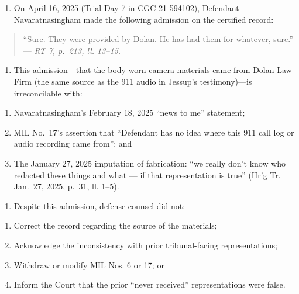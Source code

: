 \begin{enumerate}
\def\labelenumi{\arabic{enumi}.}
\setcounter{enumi}{47}
\tightlist
\item
  On April 16, 2025 (Trial Day 7 in CGC-21-594102), Defendant Navaratnasingham made the following admission on the certified record:
\end{enumerate}

\begin{quote}
``Sure. They were provided by Dolan. He has had them for whatever, sure.'' --- \emph{RT 7, p.~213, ll. 13--15.}
\end{quote}

\begin{enumerate}
\def\labelenumi{\arabic{enumi}.}
\setcounter{enumi}{48}
\tightlist
\item
  This admission---that the body-worn camera materials came from Dolan Law Firm (the same source as the 911 audio in Jessup's testimony)---is irreconcilable with:
\end{enumerate}

\begin{enumerate}
\def\labelenumi{(\alph{enumi})}
\item
  Navaratnasingham's February 18, 2025 ``news to me'' statement;
\item
  MIL No.~17's assertion that ``Defendant has no idea where this 911 call log or audio recording came from''; and
\item
  The January 27, 2025 imputation of fabrication: ``we really don't know who redacted these things and what --- if that representation is true'' (Hr'g Tr. Jan.~27, 2025, p.~31, ll. 1--5).
\end{enumerate}

\begin{enumerate}
\def\labelenumi{\arabic{enumi}.}
\setcounter{enumi}{49}
\tightlist
\item
  Despite this admission, defense counsel did not:
\end{enumerate}

\begin{enumerate}
\def\labelenumi{(\alph{enumi})}
\item
  Correct the record regarding the source of the materials;
\item
  Acknowledge the inconsistency with prior tribunal-facing representations;
\item
  Withdraw or modify MIL Nos. 6 or 17; or
\item
  Inform the Court that the prior ``never received'' representations were false.
\end{enumerate}

